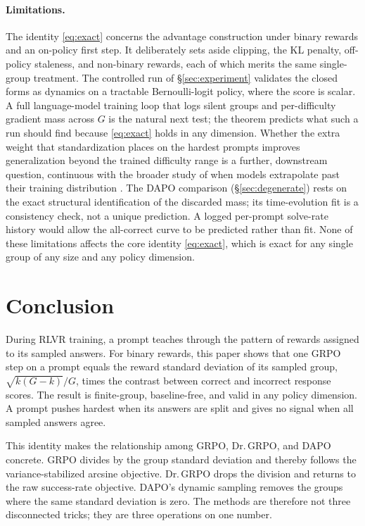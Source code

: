 \documentclass[11pt]{article}
\theoremstyle{plain}
\theoremstyle{definition}
\begin{document}
\paragraph{Limitations.} The identity \eqref{eq:exact} concerns the advantage construction under binary rewards and an on-policy first step. It deliberately sets aside clipping, the KL penalty, off-policy staleness, and non-binary rewards, each of which merits the same single-group treatment. The controlled run of \S\ref{sec:experiment} validates the closed forms as dynamics on a tractable Bernoulli-logit policy, where the score is scalar. A full language-model training loop that logs silent groups and per-difficulty gradient mass across $G$ is the natural next test; the theorem predicts what such a run should find because \eqref{eq:exact} holds in any dimension. Whether the extra weight that standardization places on the hardest prompts improves generalization beyond the trained difficulty range is a further, downstream question, continuous with the broader study of when models extrapolate past their training distribution \citep{bay2024generalization}. The DAPO comparison (\S\ref{sec:degenerate}) rests on the exact structural identification of the discarded mass; its time-evolution fit is a consistency check, not a unique prediction. A logged per-prompt solve-rate history would allow the all-correct curve to be predicted rather than fit. None of these limitations affects the core identity \eqref{eq:exact}, which is exact for any single group of any size and any policy dimension.

\section{Conclusion}

During RLVR training, a prompt teaches through the pattern of rewards assigned to its sampled answers. For binary rewards, this paper shows that one GRPO step on a prompt equals the reward standard deviation of its sampled group, $\sqrt{k(G-k)}/G$, times the contrast between correct and incorrect response scores. The result is finite-group, baseline-free, and valid in any policy dimension. A prompt pushes hardest when its answers are split and gives no signal when all sampled answers agree.

This identity makes the relationship among GRPO, Dr.\,GRPO, and DAPO concrete. GRPO divides by the group standard deviation and thereby follows the variance-stabilized arcsine objective. Dr.\,GRPO drops the division and returns to the raw success-rate objective. DAPO's dynamic sampling removes the groups where the same standard deviation is zero. The methods are therefore not three disconnected tricks; they are three operations on one number.
\end{document}
